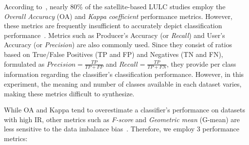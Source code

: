 \documentclass[parskip=full]{scrartcl}
\begin{document}
According to~\cite{Gavade2019}, nearly 80\% of the satellite-based LULC studies
employ the \textit{Overall Accuracy} (OA) and \textit{Kappa coefficient}
performance metrics. However, these metrics are frequently insufficient to
accurately depict classification performance~\cite{Olofsson2013, Pontius2011}.
Metrics such as Producer's Accuracy (or \textit{Recall}) and User's Accuracy
(or \textit{Precision}) are also commonly used. Since they consist of ratios
based on True/False Positives (TP and FP) and Negatives (TN and FN), formulated
as $Precision = \frac{TP}{TP+FP}$ and $Recall = \frac{TP}{TP+FN}$, they provide
per class information regarding the classifier's classification performance.
However, in this experiment, the meaning and number of classes available in
each dataset varies, making these metrics difficult to synthesize.

While OA and Kappa tend to overestimate a classifier's performance on datasets
with high IR, other metrics such as \textit{F-score} and \textit{Geometric
mean} (G-mean) are less sensitive to the data imbalance bias~\cite{Jeni2013,
Kubat1997}. Therefore, we employ 3 performance metrics:
\end{document}
